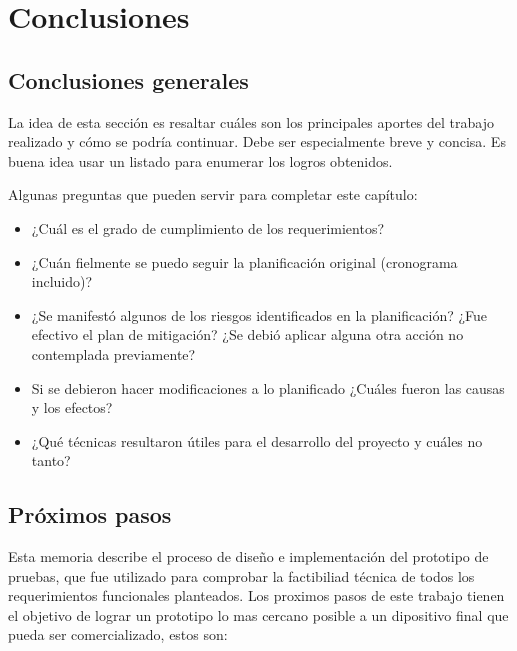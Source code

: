 
\chapter{Conclusiones} %

\label{Chapter5} %




\section{Conclusiones generales }

La idea de esta sección es resaltar cuáles son los principales aportes del trabajo realizado y cómo se podría continuar. Debe ser especialmente breve y concisa. Es buena idea usar un listado para enumerar los logros obtenidos.

Algunas preguntas que pueden servir para completar este capítulo:

\begin{itemize}
\item ¿Cuál es el grado de cumplimiento de los requerimientos?
\item ¿Cuán fielmente se puedo seguir la planificación original (cronograma incluido)?
\item ¿Se manifestó algunos de los riesgos identificados en la planificación? ¿Fue efectivo el plan de mitigación? ¿Se debió aplicar alguna otra acción no contemplada previamente?
\item Si se debieron hacer modificaciones a lo planificado ¿Cuáles fueron las causas y los efectos?
\item ¿Qué técnicas resultaron útiles para el desarrollo del proyecto y cuáles no tanto?
\end{itemize}


\section{Próximos pasos}
Esta memoria describe el proceso de diseño e implementación del prototipo de pruebas, que fue utilizado para comprobar la factibiliad técnica de todos los requerimientos funcionales planteados. Los proximos pasos de este trabajo tienen el objetivo de lograr un prototipo lo mas cercano posible a un dipositivo final que pueda ser comercializado, estos son:

